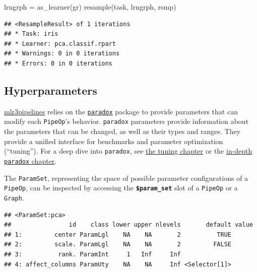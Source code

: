 \documentclass[
]{scrbook}
\newenvironment{Shaded}{\begin{snugshade}}{\end{snugshade}}
\newcommand{\FunctionTok}[1]{\textcolor[rgb]{0.00,0.00,0.00}{#1}}
\newcommand{\NormalTok}[1]{#1}
\newcommand{\OtherTok}[1]{\textcolor[rgb]{0.56,0.35,0.01}{#1}}
\newcommand{\SpecialCharTok}[1]{\textcolor[rgb]{0.00,0.00,0.00}{#1}}
\newcommand{\StringTok}[1]{\textcolor[rgb]{0.31,0.60,0.02}{#1}}
\renewenvironment{Shaded} {\begin{snugshade}\small} {\end{snugshade}}
\begin{document}
\begin{Shaded}
\begin{Highlighting}[]
\NormalTok{lrngrph }\OtherTok{=} \FunctionTok{as\_learner}\NormalTok{(gr)}
\FunctionTok{resample}\NormalTok{(task, lrngrph, rsmp)}
\end{Highlighting}
\end{Shaded}

\begin{verbatim}
## <ResampleResult> of 1 iterations
## * Task: iris
## * Learner: pca.classif.rpart
## * Warnings: 0 in 0 iterations
## * Errors: 0 in 0 iterations
\end{verbatim}

\hypertarget{hyperparameters}{%
\subsection{Hyperparameters}\label{hyperparameters}}

\href{https://cran.r-project.org/package=mlr3pipelines}{mlr3pipelines} relies on the \href{https://paradox.mlr-org.com}{\texttt{paradox}} package to provide parameters that can modify each \texttt{PipeOp}'s behavior.
\texttt{paradox} parameters provide information about the parameters that can be changed, as well as their types and ranges.
They provide a unified interface for benchmarks and parameter optimization (``tuning'').
For a deep dive into \texttt{paradox}, see \protect\hyperlink{searchspace}{the tuning chapter} or the \protect\hyperlink{paradox}{in-depth \texttt{paradox} chapter}.

The \texttt{ParamSet}, representing the space of possible parameter configurations of a \texttt{PipeOp}, can be inspected by accessing the \textbf{\texttt{\$param\_set}} slot of a \texttt{PipeOp} or a \texttt{Graph}.

\begin{Shaded}
\end{Shaded}

\begin{verbatim}
## <ParamSet:pca>
##                id    class lower upper nlevels       default value
## 1:         center ParamLgl    NA    NA       2          TRUE      
## 2:         scale. ParamLgl    NA    NA       2         FALSE      
## 3:          rank. ParamInt     1   Inf     Inf                    
## 4: affect_columns ParamUty    NA    NA     Inf <Selector[1]>
\end{verbatim}
\end{document}
